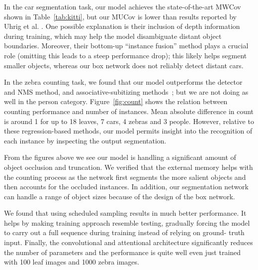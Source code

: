 In the car segmentation task, our model achieves the state-of-the-art MWCov
shown in Table~\ref{tab:kitti}, but our MUCov is lower than results reported by
Uhrig et al. \cite{uhrig16insseg}. One possible explanation is their inclusion
of depth information during training, which may help the model disambiguate
distant object boundaries. Moreover, their bottom-up ``instance fusion'' method
plays a crucial role (omitting this leads to a steep performance drop); this
likely helps segment smaller objects, whereas our box network does not reliably
detect distant cars.

In the zebra counting task, we found that our model outperforms the detector
and NMS method, and associative-subitizing methods~\cite{chattopadhyay16count};
but we are not doing as well in the person category. Figure~\ref{fig:count}
shows the relation between counting performance and number of instances. Mean
absolute difference in count is around 1 for up to 18 leaves, 7 cars, 4 zebras
and 3 people. However, relative to these regression-based methods,  our model
permits insight into the recognition of each instance by inspecting the output
segmentation.

From the figures above we see our model is handling a significant amount of
object occlusion and truncation. We verified that the external memory helps
with the counting process as the network first segments the more salient
objects and then accounts for the occluded instances. In addition, our
segmentation network can handle a range of object sizes because of the
design of the box network.

We found that using scheduled sampling results in much better performance. It
helps by making training approach resemble testing, gradually forcing the model
to carry out a full sequence during training instead of relying on ground-
truth input. Finally, the convolutional and attentional architecture
significantly reduces the number of parameters and the performance is quite
well even just trained with 100 leaf images and 1000 zebra images.




